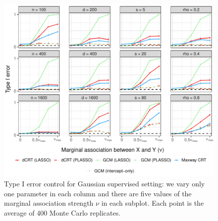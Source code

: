 \documentclass[aos]{imsart}
\theoremstyle{plain}
\theoremstyle{remark}
\begin{document}
\begin{figure}[h]
    \centering
    \includegraphics[width = \textwidth]{figures/gaussian_supervised_setting_null_partial.pdf}
    \caption{Type I error control for Gaussian supervised setting: we vary only one parameter in each column and there are five values of the marginal association strength $\nu$ in each subplot. Each point is the average of 400 Monte Carlo replicates.}
    \label{fig:gaussian_supervised_partial_null}
\end{figure}
\end{document}
